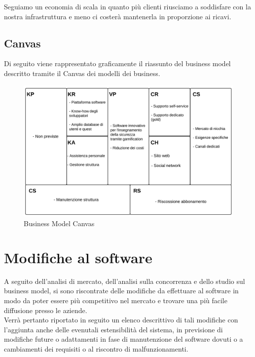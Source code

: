 Seguiamo un economia di scala in quanto più clienti riusciamo a soddisfare con la nostra infrastruttura e meno ci costerà mantenerla in proporzione ai ricavi. 

\newpage

\subsection{Canvas}

Di seguito viene rappresentato graficamente il riassunto del business model descritto tramite il Canvas dei modelli dei business.

\begin{figure}[H]
\centering
\includegraphics[scale=0.8]{images/cap5/BM.png}
\caption{Business Model Canvas}
\end{figure}


\section{Modifiche al software}
A seguito dell'analisi di mercato, dell'analisi sulla concorrenza e dello studio sul business model, si sono riscontrate delle modifiche da effettuare al software in modo da poter essere più competitivo nel mercato e trovare una più facile diffusione presso le aziende.\\
Verrà pertanto riportato in seguito un elenco descrittivo di tali modifiche con l'aggiunta anche delle evenutali estensibilità del sistema, in previsione di modifiche future o adattamenti in fase di manutenzione del software dovuti o a cambiamenti dei requisiti o al riscontro di malfunzionamenti.


